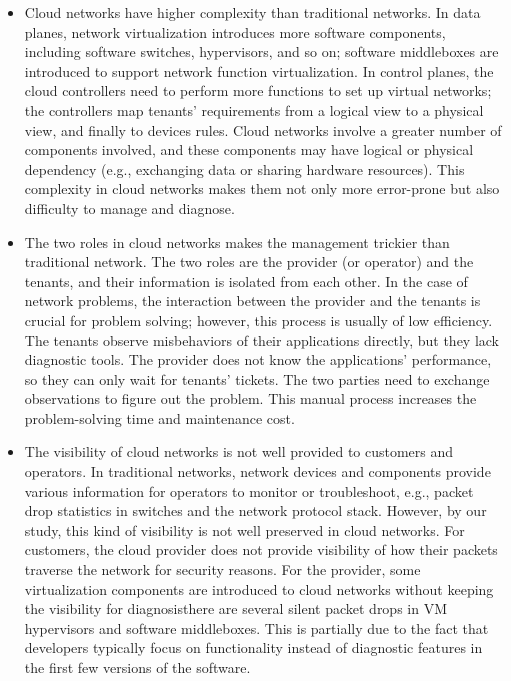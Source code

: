 \begin{itemize}
\item Cloud networks have higher complexity than traditional networks.  In data planes, network virtualization introduces more software components, including software switches, hypervisors, and so on; software middleboxes are introduced to support network function virtualization. In control planes, the cloud controllers need to perform more functions to set up virtual networks; the controllers map tenants' requirements from a logical view to a physical view, and finally to devices rules. Cloud networks involve a greater number of components involved, and these components may have logical or physical dependency (e.g., exchanging data or sharing hardware resources). This complexity in cloud networks makes them not only more error-prone but also difficulty to manage and diagnose.
\item The two roles in cloud networks makes the management trickier than traditional network. The two roles are the provider (or operator) and the tenants, and their information is isolated from each
other. In the case of network problems, the interaction between the provider and
the tenants is crucial for problem solving; however, this process is usually of low efficiency. 
The tenants observe misbehaviors of their applications directly, but they lack diagnostic tools.
The provider does not know the applications' performance, so they can only wait for tenants' tickets.
The two parties need to exchange observations to figure out the problem. This manual process increases
the problem-solving time and maintenance cost.
\item The visibility of cloud networks is not well provided to customers and operators. In traditional networks, network devices and components provide various information for operators to monitor or troubleshoot, e.g., packet drop statistics in switches and the network protocol stack. However, by our study, this kind of visibility is not well preserved in cloud networks. For customers, the cloud provider does not provide visibility of how their packets traverse the network for security reasons. For the provider, some virtualization components are introduced to cloud networks without keeping the visibility for diagnosis\textemdash there are several silent packet drops in VM hypervisors and software middleboxes. This is partially due to the fact that developers typically focus on functionality instead of diagnostic features in the first few versions of the software.
\end{itemize}


